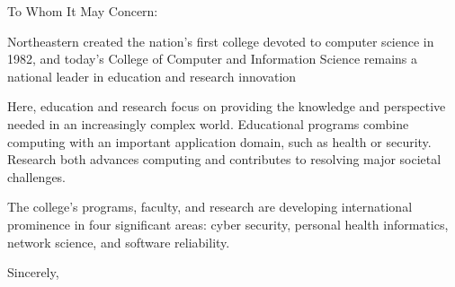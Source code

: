 \documentclass{hnuletter}
\date{October 06, 2016}
\begin{document}
\begin{letter}{}

\opening{To Whom It May Concern:}

Northeastern created the nation's first college devoted to computer science in 1982, and today's College of Computer and Information Science remains a
national leader in education and research innovation

Here, education and research focus on providing the knowledge and perspective needed in an increasingly complex world. Educational programs combine computing with an important application domain, such as health or security. Research both advances computing and contributes to resolving major societal challenges.

The college's programs, faculty, and research are developing international prominence in four significant areas: cyber security, personal health informatics, network science, and software reliability.


\closing{Sincerely,}

\end{letter}
\end{document}
